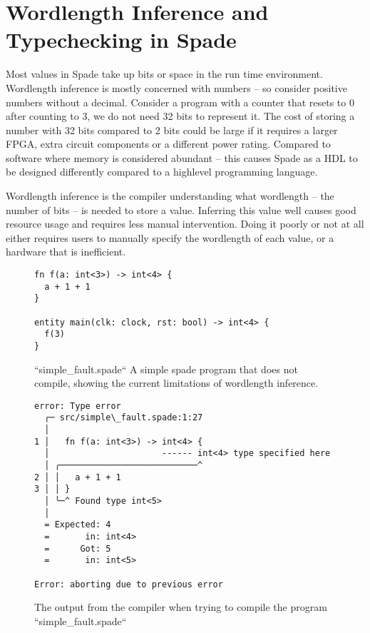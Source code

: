 \section{Wordlength Inference and Typechecking in Spade}
\label{sec:TheProblem}
Most values in Spade take up bits or space in the run time environment. Wordlength inference is mostly concerned with numbers -- so consider positive numbers without a decimal. Consider a program with a counter that resets to 0 after counting to 3, we do not need 32 bits to represent it. The cost of storing a number with 32 bits compared to 2 bits could be large if it requires a larger FPGA, extra circuit components or a different power rating. Compared to software where memory is considered abundant -- this causes Spade as a HDL to be designed differently compared to a highlevel programming language.

Wordlength inference is the compiler understanding what wordlength -- the number of bits -- is needed to store a value. Inferring this value well causes good resource usage and requires less manual intervention. Doing it poorly or not at all either requires users to manually specify the wordlength of each value, or a hardware that is inefficient.

\begin{figure}[h]
\begin{center}
\begin{verbatim}
fn f(a: int<3>) -> int<4> {
  a + 1 + 1
}

entity main(clk: clock, rst: bool) -> int<4> {
  f(3)
}
\end{verbatim}
\end{center}
\label{fig:SimpleFaultSpade}
\caption{``simple\_fault.spade`` A simple spade program that does not compile, showing the current limitations of wordlength inference.}
\end{figure}

\begin{figure}[h]
\begin{center}
\begin{verbatim}
error: Type error
  ┌─ src/simple\_fault.spade:1:27
  │
1 │   fn f(a: int<3>) -> int<4> {
  │                      ------ int<4> type specified here
  │ ╭───────────────────────────^
2 │ │   a + 1 + 1
3 │ │ }
  │ ╰─^ Found type int<5>
  │
  = Expected: 4
  =       in: int<4>
  =      Got: 5
  =       in: int<5>

Error: aborting due to previous error
\end{verbatim}
\end{center}
\label{fig:SimpleFaultSpadeCompileOutput}
\caption{The output from the compiler when trying to compile the program ``simple\_fault.spade``}
\end{figure}

